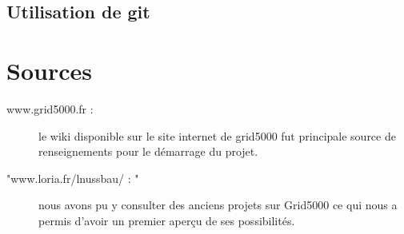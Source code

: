 \documentclass{report}
\begin{document}
\section{Utilisation de git}

\appendix
\chapter{Sources}
\begin{description}
\item[www.grid5000.fr : ]le wiki disponible sur le site internet de grid5000 fut principale source de renseignements pour le démarrage du projet.
\item["www.loria.fr/lnussbau/ : "]nous avons pu y consulter des anciens projets sur Grid5000 ce qui nous a permis d'avoir un premier aperçu de ses possibilités.
\end{description}
\end{document}

